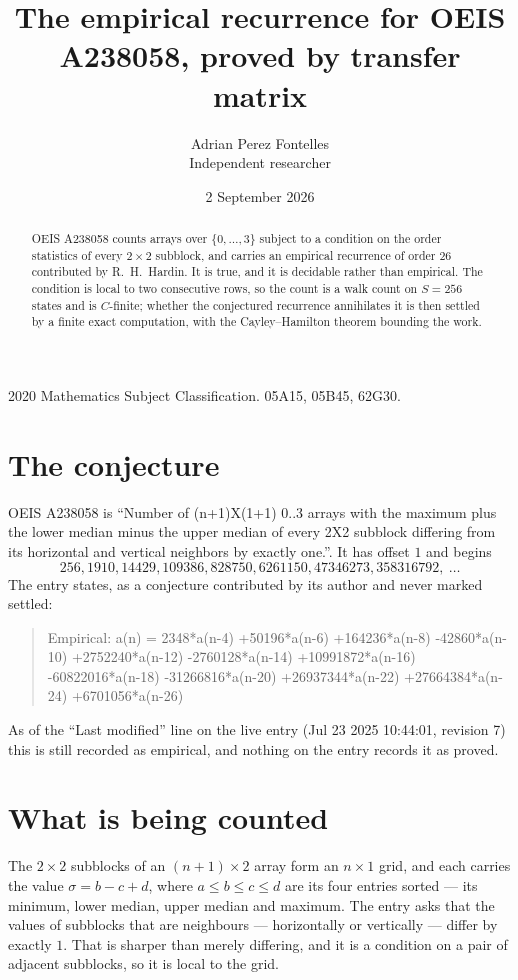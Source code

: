 \documentclass[11pt,a4paper]{article}
\title{The empirical recurrence for OEIS A238058, proved by transfer matrix}
\author{Adrian Perez Fontelles\\ \small Independent researcher}
\date{2 September 2026}
\theoremstyle{plain}
\theoremstyle{definition}
\begin{document}
\maketitle

\begin{abstract}
OEIS A238058 counts arrays over $\{0,\dots,3\}$ subject to a condition on the order
statistics of every $2\times2$ subblock, and carries an empirical recurrence of order
$26$ contributed by R.~H.~Hardin. It is true, and it is decidable rather than empirical.
The condition is local to two consecutive rows, so the count is a walk count on $S=256$
states and is $C$-finite; whether the conjectured recurrence annihilates it is then settled by
a finite exact computation, with the Cayley--Hamilton theorem bounding the work.
\end{abstract}

\noindent\small 2020 Mathematics Subject Classification. 05A15, 05B45, 62G30.\normalsize

\section{The conjecture}

OEIS A238058 is ``Number of (n+1)X(1+1) 0..3 arrays with the maximum plus the lower median minus the upper median of every 2X2 subblock differing from its horizontal and vertical neighbors by exactly one.''. It has offset $1$ and begins
\[
256, 1910, 14429, 109386, 828750, 6261150, 47346273, 358316792,\ \dots
\]
The entry states, as a conjecture contributed by its author and never marked settled:
\begin{quote}
Empirical: a(n) = 2348*a(n-4) +50196*a(n-6) +164236*a(n-8) -42860*a(n-10) +2752240*a(n-12) -2760128*a(n-14) +10991872*a(n-16) -60822016*a(n-18) -31266816*a(n-20) +26937344*a(n-22) +27664384*a(n-24) +6701056*a(n-26)
\end{quote}
As of the ``Last modified'' line on the live entry (Jul 23 2025 10:44:01, revision 7) this is still
recorded as empirical, and nothing on the entry records it as proved.

\section{What is being counted}

The $2\times2$ subblocks of an $(n+1)\times2$ array form an
$n\times1$ grid, and each carries the value $\sigma=b-c+d$, where $a\le b\le c\le d$ are its four entries sorted --- its minimum, lower median, upper median and maximum. The entry asks that the values of
subblocks that are neighbours --- horizontally or vertically --- differ by exactly $1$.
That is sharper than merely differing, and it is a condition on a pair of adjacent subblocks,
so it is local to the grid.
\end{document}
